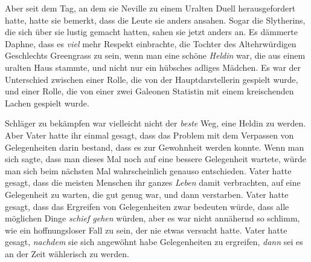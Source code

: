 Aber seit dem Tag, an dem sie Neville zu einem Uralten Duell herausgefordert hatte, hatte sie bemerkt, dass die Leute sie anders ansahen. Sogar die Slytherins, die sich über sie lustig gemacht hatten, sahen sie jetzt anders an. Es dämmerte Daphne, dass es \emph{viel} mehr Respekt einbrachte, die Tochter des Altehrwürdigen Geschlechts Greengrass zu sein, wenn man eine schöne \emph{Heldin} war, die aus einem uralten Haus stammte, und nicht nur ein hübsches adliges Mädchen. Es war der Unterschied zwischen einer Rolle, die von der Hauptdarstellerin gespielt wurde, und einer Rolle, die von einer zwei Galeonen Statistin mit einem kreischenden Lachen gespielt wurde.

Schläger zu bekämpfen war vielleicht nicht der \emph{beste} Weg, eine Heldin zu werden. Aber Vater hatte ihr einmal gesagt, dass das Problem mit dem Verpassen von Gelegenheiten darin bestand, dass es zur Gewohnheit werden konnte. Wenn man sich sagte, dass man dieses Mal noch auf eine bessere Gelegenheit wartete, würde man sich beim nächsten Mal wahrscheinlich genauso entschieden. Vater hatte gesagt, dass die meisten Menschen ihr ganzes \emph{Leben} damit verbrachten, auf eine Gelegenheit zu warten, die gut genug war, und dann verstarben. Vater hatte gesagt, dass das Ergreifen von Gelegenheiten zwar bedeuten würde, dass alle möglichen Dinge \emph{schief gehen} würden, aber es war nicht annähernd so schlimm, wie ein hoffnungsloser Fall zu sein, der nie etwas versucht hatte. Vater hatte gesagt, \emph{nachdem} sie sich angewöhnt habe Gelegenheiten zu ergreifen, \emph{dann} sei es an der Zeit wählerisch zu werden.

